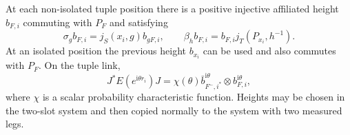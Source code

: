 \begin{proposition}\label{prop:heights-tuples}
At each non-isolated tuple position there is a positive injective affiliated
height $b_{F,i}$ commuting with $P_F$ and satisfying
\begin{equation}\label{eq:input-17}
 \sigma_g b_{F,i}=j_S(x_i,g)b_{gF,i},\qquad
 \beta_h b_{F,i}=b_{F,i}j_T(P_{x_i},h^{-1}).
\end{equation}
At an isolated position the previous height $b_{x_i}$ can be used and also
commutes with $P_F$.  On the tuple link,
\begin{equation}\label{eq:input-18}
 J^*E(e^{\mathrm i\theta r_i})J
 =\chi(\theta)
   \bar b_{F^-,i^*}^{\mathrm i\theta}\otimes b_{F,i}^{\mathrm i\theta},
\end{equation}
where $\chi$ is a scalar probability characteristic function.  Heights may
be chosen in the two-slot system and then copied normally to the system
with two measured legs.
\end{proposition}

